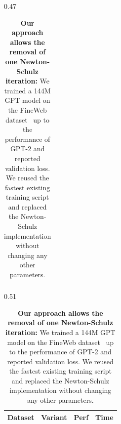 \begin{table}[t]
\begin{subtable}{0.47\linewidth}
\begin{tabular}{lccc}
        \bottomrule
        \end{tabular}
        \caption{\textbf{Our approach allows the removal of one Newton-Schulz iteration:} We trained a 144M GPT model on the FineWeb dataset~\cite{penedo2024fineweb} up to the performance of GPT-2 and reported validation loss. We reused the fastest existing training script and replaced the Newton-Schulz implementation without changing any other parameters. %
        }
        \label{tab:nanoGPT_accuracy}
\end{subtable}
\hfill
\begin{subtable}{0.51\linewidth}
    \centering
        \begin{tabular}{lccc}
        \toprule
        \textbf{Dataset} & \textbf{Variant} & \textbf{Perf} & \textbf{Time}   \\
        \hline
        

\end{tabular}
\end{subtable}
\end{table}
